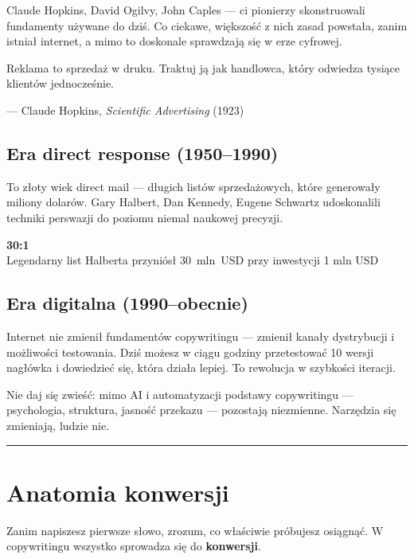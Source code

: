 \documentclass[
  12pt,
  a4paper,
  twoside,
  openright,
  12pt,
  DIV=12,
  BCOR=12mm]{scrbook}
\newcommand{\decoline}{%
  \begin{center}
    \textcolor{bordergray}{\rule{0.3\textwidth}{0.5pt}}
  \end{center}
}
\newcommand{\stathighlight}[2]{%
  \begin{center}
    \begin{tcolorbox}[
      enhanced,
      colback=primarylight,
      colframe=primaryblue,
      boxrule=1pt,
      arc=5pt,
      width=0.6\textwidth,
      halign=center
    ]
      {\fontsize{36}{40}\selectfont\bfseries\color{primarydark}#1}\\[5pt]
      {\color{textmuted}#2}
    \end{tcolorbox}
  \end{center}
}
\begin{document}
Claude Hopkins, David Ogilvy, John Caples --- ci pionierzy skonstruowali
fundamenty używane do dziś. Co ciekawe, większość z nich zasad powstała,
zanim istniał internet, a mimo to doskonale sprawdzają się w erze
cyfrowej.

\begin{cytat}
Reklama to sprzedaż w druku. Traktuj ją jak handlowca, który odwiedza tysiące klientów jednocześnie.

\hfill--- Claude Hopkins, \textit{Scientific Advertising} (1923)
\end{cytat}

\subsection{Era direct response
(1950--1990)}\label{era-direct-response-19501990}

To złoty wiek direct mail --- długich listów sprzedażowych, które
generowały miliony dolarów. Gary Halbert, Dan Kennedy, Eugene Schwartz
udoskonalili techniki perswazji do poziomu niemal naukowej precyzji.

\stathighlight{30:1}{Legendarny list Halberta przyniósł \mbox{30 mln USD} przy inwestycji 1 mln USD}

\subsection{Era digitalna
(1990--obecnie)}\label{era-digitalna-1990obecnie}

Internet nie zmienił fundamentów copywritingu --- zmienił kanały
dystrybucji i możliwości testowania. Dziś możesz w ciągu godziny
przetestować 10 wersji nagłówka i dowiedzieć się, która działa lepiej.
To rewolucja w szybkości iteracji.

\begin{wazne}
Nie daj się zwieść: mimo AI i automatyzacji podstawy copywritingu --- psychologia, struktura, jasność przekazu --- pozostają niezmienne. Narzędzia się zmieniają, ludzie nie.
\end{wazne}

\decoline

\section{Anatomia konwersji}\label{anatomia-konwersji}

Zanim napiszesz pierwsze słowo, zrozum, co właściwie próbujesz osiągnąć.
W copywritingu wszystko sprowadza się do \textbf{konwersji}.
\end{document}
